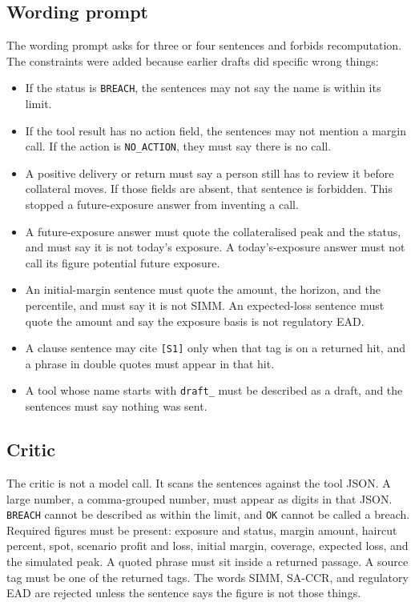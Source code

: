 \documentclass[11pt,a4paper]{article}
\begin{document}
\subsection{Wording prompt}

The wording prompt asks for three or four sentences and forbids recomputation. The constraints were added because earlier drafts did specific wrong things:

\begin{itemize}
  \item If the status is \texttt{BREACH}, the sentences may not say the name is within its limit.
  \item If the tool result has no action field, the sentences may not mention a margin call. If the action is \texttt{NO\_ACTION}, they must say there is no call.
  \item A positive delivery or return must say a person still has to review it before collateral moves. If those fields are absent, that sentence is forbidden. This stopped a future-exposure answer from inventing a call.
  \item A future-exposure answer must quote the collateralised peak and the status, and must say it is not today's exposure. A today's-exposure answer must not call its figure potential future exposure.
  \item An initial-margin sentence must quote the amount, the horizon, and the percentile, and must say it is not SIMM. An expected-loss sentence must quote the amount and say the exposure basis is not regulatory EAD.
  \item A clause sentence may cite \texttt{[S1]} only when that tag is on a returned hit, and a phrase in double quotes must appear in that hit.
  \item A tool whose name starts with \texttt{draft\_} must be described as a draft, and the sentences must say nothing was sent.
\end{itemize}

\subsection{Critic}

The critic is not a model call. It scans the sentences against the tool JSON. A large number, a comma-grouped number, must appear as digits in that JSON. \texttt{BREACH} cannot be described as within the limit, and \texttt{OK} cannot be called a breach. Required figures must be present: exposure and status, margin amount, haircut percent, spot, scenario profit and loss, initial margin, coverage, expected loss, and the simulated peak. A quoted phrase must sit inside a returned passage. A source tag must be one of the returned tags. The words SIMM, SA-CCR, and regulatory EAD are rejected unless the sentence says the figure is not those things.
\end{document}
